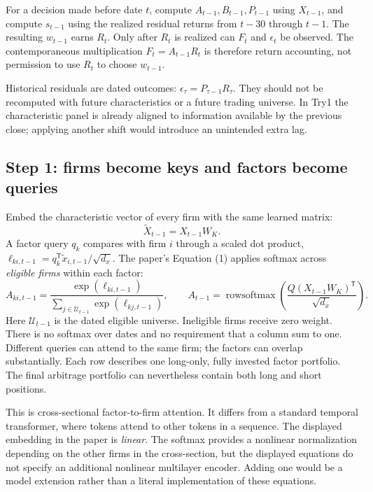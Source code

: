 \documentclass[11pt]{article}
\begin{document}
For a decision made before date $t$, compute $A_{t-1},B_{t-1},P_{t-1}$
using $X_{t-1}$, and compute $s_{t-1}$ using the realized residual returns
from $t-30$ through $t-1$. The resulting $w_{t-1}$ earns $R_t$.
Only after $R_t$ is realized can $F_t$ and $\epsilon_t$ be observed.
The contemporaneous multiplication $F_t=A_{t-1}R_t$ is therefore
return accounting, not permission to use $R_t$ to choose $w_{t-1}$.

Historical residuals are dated outcomes:
$\epsilon_\tau=P_{\tau-1}R_\tau$. They should not be recomputed with
future characteristics or a future trading universe. In Try1 the
characteristic panel is already aligned to information available by
the previous close; applying another shift would introduce an
unintended extra lag.

\subsection{Step 1: firms become keys and factors become queries}
\label{sec:attention}

Embed the characteristic vector of every firm with the same learned
matrix:
\begin{equation}
 \widetilde X_{t-1}=X_{t-1}W_K.
 \label{eq:embedding}
\end{equation}
A factor query $q_k$ compares with firm $i$ through a scaled dot product,
$\ell_{ki,t-1}=q_k^{\mathsf T}\widetilde x_{i,t-1}/\sqrt{d_x}$.
The paper's Equation (1) applies softmax across \emph{eligible firms}
within each factor:
\begin{equation}
 A_{ki,t-1}
 =\frac{\exp(\ell_{ki,t-1})}
 {\sum_{j\in\mathcal U_{t-1}}\exp(\ell_{kj,t-1})},\qquad
 A_{t-1}=\operatorname{rowsoftmax}
 \left(\frac{Q(X_{t-1}W_K)^{\mathsf T}}{\sqrt{d_x}}\right).
 \label{eq:attention}
\end{equation}
Here $\mathcal U_{t-1}$ is the dated eligible universe. Ineligible firms
receive zero weight. There is no softmax over dates and no requirement
that a column sum to one. Different queries can attend to the same firm;
the factors can overlap substantially. Each row describes one long-only,
fully invested factor portfolio. The final arbitrage portfolio can
nevertheless contain both long and short positions.

This is cross-sectional factor-to-firm attention. It differs from a
standard temporal transformer, where tokens attend to other tokens in a
sequence. The displayed embedding in the paper is \emph{linear}. The
softmax provides a nonlinear normalization depending on the other firms
in the cross-section, but the displayed equations do not specify an
additional nonlinear multilayer encoder. Adding one would be a model
extension rather than a literal implementation of these equations.
\end{document}
